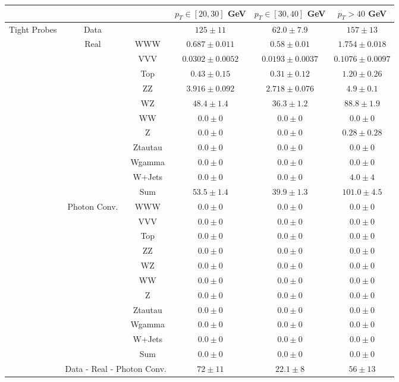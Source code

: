 \small
\begin{tabular}{|c|cc||c|c|c|}
\hline
\hline
\multicolumn{3}{|c||}{} & $p_{T}\in[20,30]$ GeV & $p_{T}\in[30,40]$ GeV & $p_{T} > 40$ GeV\\ 
\hline
\hline
\multirow{23}{*}{Tight Probes} & Data & &  $125 \pm 11$ &  $62.0 \pm 7.9$ &  $157 \pm 13$\\ 
\cline{2-6}

&\multirow{11}{*}{Real} & WWW &  $0.687 \pm 0.011$ &  $0.58 \pm 0.01$ &  $1.754 \pm 0.018$\\ 
&& VVV &  $0.0302 \pm 0.0052$ &  $0.0193 \pm 0.0037$ &  $0.1076 \pm 0.0097$\\ 
&& Top &  $0.43 \pm 0.15$ &  $0.31 \pm 0.12$ &  $1.20 \pm 0.26$\\ 
&& ZZ &  $3.916 \pm 0.092$ &  $2.718 \pm 0.076$ &  $4.9 \pm 0.1$\\ 
&& WZ &  $48.4 \pm 1.4$ &  $36.3 \pm 1.2$ &  $88.8 \pm 1.9$\\ 
&& WW &  $0.0 \pm 0$ &  $0.0 \pm 0$ &  $0.0 \pm 0$\\ 
&& Z &  $0.0 \pm 0$ &  $0.0 \pm 0$ &  $0.28 \pm 0.28$\\ 
&& Ztautau &  $0.0 \pm 0$ &  $0.0 \pm 0$ &  $0.0 \pm 0$\\ 
&& Wgamma &  $0.0 \pm 0$ &  $0.0 \pm 0$ &  $0.0 \pm 0$\\ 
&& W+Jets &  $0.0 \pm 0$ &  $0.0 \pm 0$ &  $4.0 \pm 4$\\ 
\cline{3-6}
&& Sum &  $53.5 \pm 1.4$ &  $39.9 \pm 1.3$ &  $101.0 \pm 4.5$\\ 
\cline{2-6}
\cline{2-6}
&\multirow{11}{*}{Photon Conv.} &WWW &  $0.0 \pm 0$ &  $0.0 \pm 0$ &  $0.0 \pm 0$\\ 
&& VVV &  $0.0 \pm 0$ &  $0.0 \pm 0$ &  $0.0 \pm 0$\\ 
&& Top &  $0.0 \pm 0$ &  $0.0 \pm 0$ &  $0.0 \pm 0$\\ 
&& ZZ &  $0.0 \pm 0$ &  $0.0 \pm 0$ &  $0.0 \pm 0$\\ 
&& WZ &  $0.0 \pm 0$ &  $0.0 \pm 0$ &  $0.0 \pm 0$\\ 
&& WW &  $0.0 \pm 0$ &  $0.0 \pm 0$ &  $0.0 \pm 0$\\ 
&& Z &  $0.0 \pm 0$ &  $0.0 \pm 0$ &  $0.0 \pm 0$\\ 
&& Ztautau &  $0.0 \pm 0$ &  $0.0 \pm 0$ &  $0.0 \pm 0$\\ 
&& Wgamma &  $0.0 \pm 0$ &  $0.0 \pm 0$ &  $0.0 \pm 0$\\ 
&& W+Jets &  $0.0 \pm 0$ &  $0.0 \pm 0$ &  $0.0 \pm 0$\\ 
\cline{3-6}
&& Sum &  $0.0 \pm 0$ &  $0.0 \pm 0$ &  $0.0 \pm 0$\\ 
\cline{2-6}
\cline{2-6}
&\multicolumn{2}{|c||}{Data - Real - Photon Conv.}&  $ 72 \pm 11$ &  $22.1 \pm 8$ &  $ 56 \pm 13$\\ 


\end{tabular}
